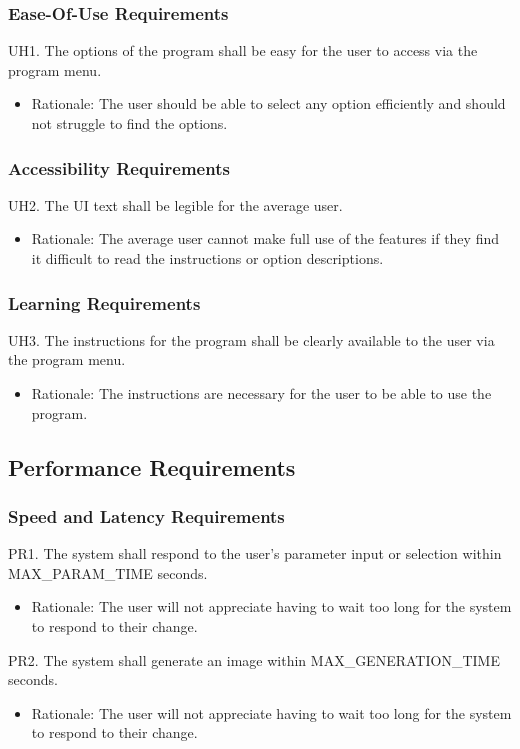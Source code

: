 \documentclass[12pt, titlepage]{article}
\begin{document}
\subsubsection{Ease-Of-Use Requirements}
UH1. The options of the program shall be easy for the user to access via the program menu.
\begin{itemize}
    \item Rationale: The user should be able to select any option efficiently and should not struggle to find the options.
\end{itemize}
\subsubsection{Accessibility Requirements}
UH2. The UI text shall be legible for the average user.
\begin{itemize}
    \item Rationale: The average user cannot make full use of the features if they find it difficult to read the instructions or option descriptions.
\end{itemize}
\subsubsection{Learning Requirements}
UH3. The instructions for the program shall be clearly available to the user via the program menu.
\begin{itemize}
    \item Rationale: The instructions are necessary for the user to be able to use the program.
\end{itemize}
\subsection{Performance Requirements}
\subsubsection{Speed and Latency Requirements}
PR1. The system shall respond to the user's parameter input or selection within MAX\_PARAM\_TIME seconds.
\begin{itemize}
    \item Rationale: The user will not appreciate having to wait too long for the system to respond to their change.
\end{itemize}
PR2. The system shall generate an image within MAX\_GENERATION\_TIME seconds.
\begin{itemize}
    \item Rationale: The user will not appreciate having to wait too long for the system to respond to their change.
\end{itemize}
\end{document}
